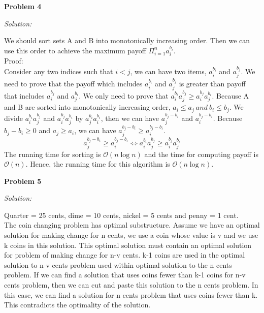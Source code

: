 \documentclass[12pt,letterpaper]{article}
\def\pp{\par\noindent}
\newcommand{\problem}[1]{ \bigskip \pp \textbf{Problem #1}\par}
\newcommand{\solution}{\textit{Solution:}\par}
\begin{document}
\problem{4}
\solution
We should sort sets A and B into monotonically increasing order. Then we can use this order to achieve the maximum payoff $ \Pi _{i = 1}^{n} a_i^{b_i}$.\\
Proof: \\
Consider any two indices such that $i < j$, we can have two items, $a_i^{b_i}$ and $a_j^{b_j}$. We need to prove that the payoff which includes $a_i^{b_i}$ and $a_j^{b_j}$ is greater than payoff that includes $a_i^{b_j}$ and $a_j^{b_i}$. We only need to prove that $a_i^{b_i} a_j^{b_j} \ge a_i^{b_j} a_j^{b_i}$. Because A and B are sorted into monotonically increasing order, $a_i \le a_j\ and\ b_i \le b_j$. We divide $a_i^{b_i} a_j^{b_j}$ and $a_i^{b_j} a_j^{b_i}$ by $a_j^{b_i} a_i^{b_i}$, then we can have $a_j^{b_j - b_i}$ and $a_i^{b_j - b_i}$. Because $b_j - b_i \ge 0$ and $a_j \ge a_i$, we can have $a_j^{b_j - b_i} \ge a_i^{b_j - b_i}$.\\
$$a_j^{b_j - b_i} \ge a_i^{b_j - b_i} \Leftrightarrow a_i^{b_i} a_j^{b_j} \ge a_i^{b_j} a_j^{b_i}$$
The running time for sorting is $\mathcal{O}(n \log n)$ and the time for computing payoff is $\mathcal{O}(n)$. Hence, the running time for this algorithm is $\mathcal{O}(n \log n)$.

\problem{5}
\solution
Quarter = 25 cents, dime = 10 cents, nickel = 5 cents and penny = 1 cent. \\
The coin changing problem has optimal substructure. Assume we have an optimal solution for making change for n cents, we use a coin whose value is v and we use k coins in this solution. This optimal solution must contain an optimal solution for problem of making change for n-v cents. k-1 coins are used in the optimal solution to n-v cents problem used within optimal solution to the n cents problem. If we can find a solution that uses coins fewer than k-1 coins for n-v cents problem, then we can cut and paste this solution to the n cents problem. In this case, we can find a solution for n cents problem that uses coins fewer than k. This contradicts the optimality of the solution. \\
\end{document}
